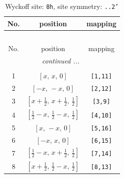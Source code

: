 \documentclass[fleqn,8pt]{jsarticle}
\begin{document}
\begin{longtable}{ccc}
\caption{Wyckoff site: {\tt 8h}, site symmetry: {\tt ..2'}}
 \\
 \hline \hline
No. & position & mapping \\ \hline \endfirsthead

\multicolumn{2}{l}{\tablename\ \thetable{}} \\
 \hline \hline
No. & position & mapping \\ \hline \endhead

 \hline \hline
\multicolumn{2}{r}{\footnotesize\it continued ...} \\ \endfoot

 \hline \hline
\multicolumn{2}{r}{} \\ \endlastfoot

1 & $\left[ x,\, x,\, 0 \right]$ & {\tt [1,11]} \\ \hline
2 & $\left[ - x,\, - x,\, 0 \right]$ & {\tt [2,12]} \\ \hline
3 & $\left[ x + \frac{1}{2},\, x + \frac{1}{2},\, \frac{1}{2} \right]$ & {\tt [3,9]} \\ \hline
4 & $\left[ \frac{1}{2} - x,\, \frac{1}{2} - x,\, \frac{1}{2} \right]$ & {\tt [4,10]} \\ \hline
5 & $\left[ x,\, - x,\, 0 \right]$ & {\tt [5,16]} \\ \hline
6 & $\left[ - x,\, x,\, 0 \right]$ & {\tt [6,15]} \\ \hline
7 & $\left[ \frac{1}{2} - x,\, x + \frac{1}{2},\, \frac{1}{2} \right]$ & {\tt [7,14]} \\ \hline
8 & $\left[ x + \frac{1}{2},\, \frac{1}{2} - x,\, \frac{1}{2} \right]$ & {\tt [8,13]} \\
\end{longtable}
\renewcommand{\arraystretch}{1.2}
\end{document}
